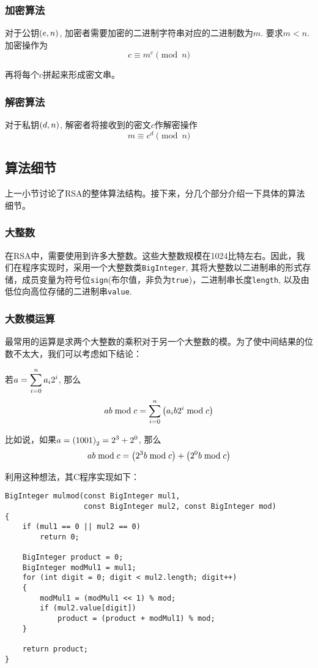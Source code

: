 \subsubsection{加密算法}
对于公钥$\left( {e, n}\right)$, 加密者需要加密的二进制字符串对应的二进制数为$m$. 要求$m<n$. 加密操作为
\begin{equation}
c\equiv m^e\pmod{n}
\end{equation}

再将每个$c$拼起来形成密文串。
\subsubsection{解密算法}
对于私钥$\left( {d, n}\right)$, 解密者将接收到的密文$c$作解密操作
\begin{equation}
m\equiv c^d\pmod{n}
\end{equation}
\subsection{算法细节}
上一小节讨论了RSA的整体算法结构。接下来，分几个部分介绍一下具体的算法细节。
\subsubsection{大整数}
在RSA中，需要使用到许多大整数。这些大整数规模在1024比特左右。因此，我们在程序实现时，采用一个大整数类\verb`BigInteger`, 其将大整数以二进制串的形式存储，成员变量为符号位\verb`sign`(布尔值，非负为\verb`true`)，二进制串长度\verb`length`, 以及由低位向高位存储的二进制串\verb`value`.
\subsubsection{大数模运算}
最常用的运算是求两个大整数的乘积对于另一个大整数的模。为了使中间结果的位数不太大，我们可以考虑如下结论：\par
若$\displaystyle a=\sum_{i=0}^na_i2^i$, 那么
\begin{equation}
ab\bmod{c}=\sum_{i=0}^n\left( {a_ib2^i\bmod{c}}\right)
\end{equation}

比如说，如果$\displaystyle a=\left( {1001}\right)_2=2^3+2^0$, 那么
\[
ab\bmod{c}=\left( {2^3b\bmod{c}}\right)+\left( {2^0b\bmod{c}}\right)
\]

利用这种想法，其C程序实现如下：
\begin{prove}
\begin{verbatim}
BigInteger mulmod(const BigInteger mul1,
                  const BigInteger mul2, const BigInteger mod)
{
    if (mul1 == 0 || mul2 == 0)
        return 0;
    
    BigInteger product = 0;
    BigInteger modMul1 = mul1;
    for (int digit = 0; digit < mul2.length; digit++)
    {
        modMul1 = (modMul1 << 1) % mod;
        if (mul2.value[digit])
            product = (product + modMul1) % mod;
    }
    
    return product;
}
\end{verbatim}
\end{prove}

